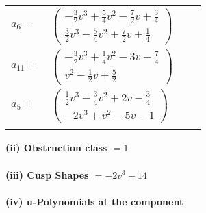 \documentclass[1p]{elsarticle_modified}
\theoremstyle{definition}
\begin{document}
\begin{tabular}{m{7pt} m{180pt} m{7pt} m{180pt} }
\flushright $a_{6}=$&$\begin{pmatrix}-\frac{3}{2} v^3+\frac{5}{4} v^2-\frac{7}{2} v+\frac{3}{4}\\\frac{3}{2} v^3-\frac{5}{4} v^2+\frac{7}{2} v+\frac{1}{4}\end{pmatrix}$ \\
\flushright $a_{11}=$&$\begin{pmatrix}-\frac{3}{2} v^3+\frac{1}{4} v^2-3 v-\frac{7}{4}\\v^2-\frac{1}{2} v+\frac{5}{2}\end{pmatrix}$ \\
\flushright $a_{5}=$&$\begin{pmatrix}\frac{1}{2} v^3-\frac{3}{4} v^2+2 v-\frac{3}{4}\\-2 v^3+v^2-5 v-1\end{pmatrix}$\\&\end{tabular}
\flushleft \textbf{(ii) Obstruction class $= 1$}\\~\\
\flushleft \textbf{(iii) Cusp Shapes $= -2 v^3-14$}\\~\\
\newpage\renewcommand{\arraystretch}{1}
\flushleft \textbf{(iv) u-Polynomials at the component}\newline \\
\end{document}
